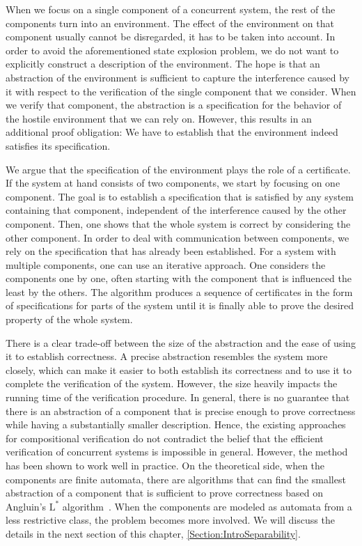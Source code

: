 \documentclass[../../diss.tex]{subfiles}
\begin{document}
When we focus on a single component of a concurrent system, the rest of the components turn into an environment.
The effect of the environment on that component usually cannot be disregarded, it has to be taken into account.
In order to avoid the aforementioned state explosion problem, we do not want to explicitly construct a description of the environment.
The hope is that an abstraction of the environment is sufficient to capture the interference caused by it with respect to the verification of the single component that we consider.
When we verify that component, the abstraction is a specification for the behavior of the hostile environment that we can rely on.
However, this results in an additional proof obligation: We have to establish that the environment indeed satisfies its specification.

We argue that the specification of the environment plays the role of a certificate.
If the system at hand consists of two components, we start by focusing on one component.
The goal is to establish a specification that is satisfied by any system containing that component, independent of the interference caused by the other component.
Then, one shows that the whole system is correct by considering the other component.
In order to deal with communication between components, we rely on the specification that has already been established.
For a system with multiple components, one can use an iterative approach.
One considers the components one by one, often starting with the component that is influenced the least by the others.
The algorithm produces a sequence of certificates in the form of specifications for parts of the system until it is finally able to prove the desired property of the whole system.

There is a clear trade-off between the size of the abstraction and the ease of using it to establish correctness.
A precise abstraction resembles the system more closely, which can make it easier to both establish its correctness and to use it to complete the verification of the system.
However, the size heavily impacts the running time of the verification procedure.
In general, there is no guarantee that there is an abstraction of a component that is precise enough to prove correctness while having a substantially smaller description.
Hence, the existing approaches for compositional verification do not contradict the belief that the efficient verification of concurrent systems is impossible in general.
However, the method has been shown to work well in practice.
On the theoretical side, when the components are finite automata, there are algorithms that can find the smallest abstraction of a component that is sufficient to prove correctness based on Angluin's $\text{L}^*$ algorithm~\cite{Angluin87,PasareanuGBCB08}.
When the components are modeled as automata from a less restrictive class, the problem becomes more involved.
We will discuss the details in the next section of this chapter, \cref{Section:IntroSeparability}.
\end{document}
